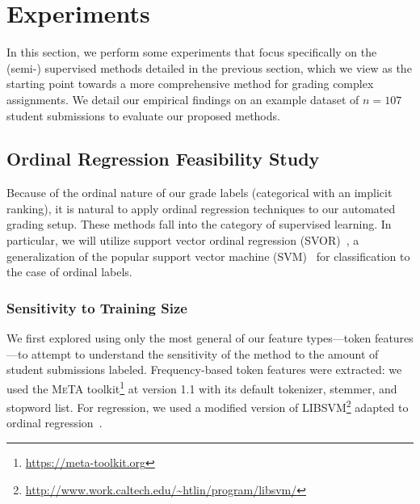 \section{Experiments}

In this section, we perform some experiments that focus specifically on the
(semi-) supervised methods detailed in the previous section, which we view
as the starting point towards a more comprehensive method for grading
complex assignments. We detail our empirical findings on an example
dataset of $n=107$ student submissions to evaluate our proposed methods.

\subsection{Ordinal Regression Feasibility Study}

Because of the ordinal nature of our grade labels (categorical with an
implicit ranking), it is natural to apply ordinal regression techniques to
our automated grading setup. These methods fall into the category of
supervised learning. In particular, we will utilize support vector
ordinal regression (SVOR)~\cite{Chu:2007:SVOR}, a generalization of the
popular support vector machine (SVM)~\cite{Cortes:1995:SVM} for
classification to the case of ordinal labels.

\subsubsection{Sensitivity to Training Size}
We first explored using only the most general of our feature types---token
features---to attempt to understand the sensitivity of the method to the
amount of student submissions labeled. Frequency-based token features were
extracted: we used the \textsc{MeTA}
toolkit\footnote{\url{https://meta-toolkit.org}} at version 1.1
with its default tokenizer, stemmer, and stopword list. For regression, we
used a modified version of
\textsc{LIBSVM}\footnote{\url{http://www.work.caltech.edu/~htlin/program/libsvm/}}
adapted to ordinal regression~\cite{Li:2007:NIPS}.

